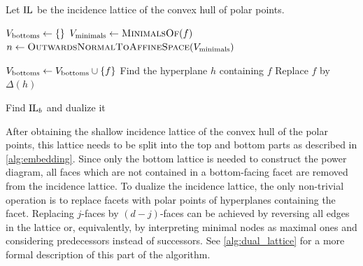 \begin{algorithm}[tbp]
    Let $\operatorname{IL}$ be the incidence lattice of the convex hull of polar points.
    \begin{algorithmic}[1]
            \State $V_{\textnormal{bottoms}} \gets \left\{  \right\}$
            \State $V_{\textnormal{minimals}} \gets \Call{MinimalsOf}{f}$
                \State $n \gets \Call{OutwardsNormalToAffineSpace}{V_{\textnormal{minimals}}}$

                    \State $V_{\textnormal{bottoms}} \gets V_{\textnormal{bottoms}} \cup \left\{ f \right\}$
                \EndIf
            \EndFor
                    \State {}
                \EndIf
            \EndFor
        \EndProcedure
        \Statex
                \State Find the hyperplane $h$ containing $f$
                \State Replace $f$ by $\Delta(h)$
            \EndFor
            \Statex{}
        \EndProcedure
    \end{algorithmic}
    \caption{Find $\operatorname{IL}_b$ and dualize it}
    \label{alg:dual_lattice}
\end{algorithm}
After obtaining the shallow incidence lattice of the convex hull of the polar points, this lattice needs to be split into the top and bottom parts as described in \cref{alg:embedding}.
Since only the bottom lattice is needed to construct the power diagram, all faces which are not contained in a bottom-facing facet are removed from the incidence lattice.
To dualize the incidence lattice, the only non-trivial operation is to replace facets with polar points of hyperplanes containing the facet.
Replacing $j$-faces by $(d-j)$-faces can be achieved by reversing all edges in the lattice or, equivalently, by interpreting minimal nodes as maximal ones and considering predecessors instead of successors.
See \cref{alg:dual_lattice} for a more formal description of this part of the algorithm.

